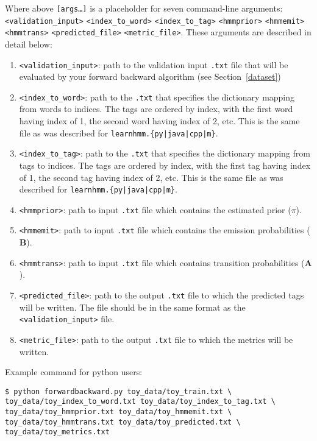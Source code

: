 \documentclass[11pt,addpoints,answers]{exam}
\begin{document}
Where above \texttt{[args\dots]} is a placeholder for seven command-line arguments:\texttt{<validation\_input>} \texttt{<index\_to\_word>} \texttt{<index\_to\_tag>} \texttt{<hmmprior>} \texttt{<hmmemit>} \texttt{<hmmtrans>} \texttt{<predicted\_file>} \texttt{<metric\_file>}. These arguments are described in detail below:
\begin{enumerate}
    \item \texttt{<validation\_input>}: path to the validation input \texttt{.txt} file that will be evaluated by your forward backward algorithm (see Section~\ref{dataset})
    \item \texttt{<index\_to\_word>}: path to the \texttt{.txt} that specifies the dictionary mapping from words to indices. The tags are ordered by index, with the first word having index of 1, the second word having index of 2, etc. This is the same file as was described for \texttt{learnhmm.\{py|java|cpp|m\}}.
    \item \texttt{<index\_to\_tag>}: path to the \texttt{.txt} that specifies the dictionary mapping from tags to indices. The tags are ordered by index, with the first tag having index of 1, the second tag having index of 2, etc. This is the same file as was described for \texttt{learnhmm.\{py|java|cpp|m\}}.
    \item \texttt{<hmmprior>}: path to input \texttt{.txt} file which contains the estimated prior (\boldmath${\pi}$).
    \item \texttt{<hmmemit>}: path to input \texttt{.txt} file which contains the emission probabilities ($\mathbf B$).
    \item \texttt{<hmmtrans>}: path to input \texttt{.txt} file which contains transition probabilities ($\mathbf A$).
    \item \texttt{<predicted\_file>}: path to the output \texttt{.txt} file to which the predicted tags will be written. The file should be in the same format as the \texttt{<validation\_input>} file. 
    \item \texttt{<metric\_file>}: path to the output \texttt{.txt} file to which the metrics will be written. 
\end{enumerate}

\clearpage

Example command for python users:
\begin{lstlisting}
$ python forwardbackward.py toy_data/toy_train.txt \ 
toy_data/toy_index_to_word.txt toy_data/toy_index_to_tag.txt \
toy_data/toy_hmmprior.txt toy_data/toy_hmmemit.txt \
toy_data/toy_hmmtrans.txt toy_data/toy_predicted.txt \ 
toy_data/toy_metrics.txt
\end{lstlisting}
\end{document}

